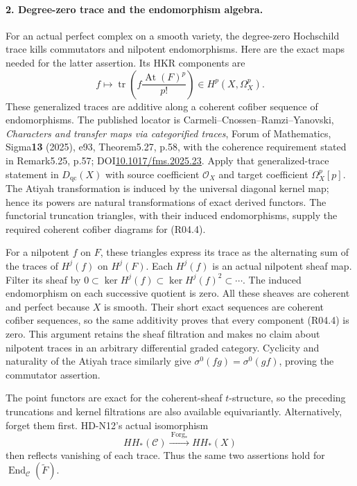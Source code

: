 \paragraph{2. Degree-zero trace and the endomorphism algebra.}
For an actual perfect complex on a smooth variety, the degree-zero
Hochschild trace kills commutators and nilpotent endomorphisms.
Here are the exact maps needed for the latter assertion. Its HKR
components are
\[
 f\longmapsto\operatorname{tr}\!\left(
                         f\frac{\operatorname{At}(F)^p}{p!}\right)
                 \in H^p(X,\Omega_X^p).                         \tag{R04.4}
\]
These generalized traces are additive along a coherent cofiber
sequence of endomorphisms. The published locator is
Carmeli--Cnossen--Ramzi--Yanovski, \emph{Characters and transfer maps
via categorified traces}, Forum of Mathematics, Sigma\textbf{13}
(2025), e93, Theorem5.27, p.58, with the coherence requirement stated
in Remark5.25, p.57; DOI\href{https://doi.org/10.1017/fms.2025.23}
{10.1017/fms.2025.23}. Apply that generalized-trace statement in
$D_{\mathrm{qc}}(X)$ with source coefficient $\mathcal O_X$ and target
coefficient $\Omega_X^p[p]$. The Atiyah transformation is induced by
the universal diagonal kernel map; hence its powers are natural
transformations of exact derived functors. The functorial truncation
triangles, with their induced endomorphisms, supply the required
coherent cofiber diagrams for (R04.4).

For a nilpotent $f$ on $F$, these triangles express its trace as the
alternating sum of the traces of $H^j(f)$ on $H^j(F)$. Each $H^j(f)$
is an actual nilpotent sheaf map. Filter its sheaf by
$0\subset\ker H^j(f)\subset\ker H^j(f)^2\subset\cdots$.
The induced endomorphism on each successive quotient is zero.
All these sheaves are coherent and perfect because $X$ is smooth.
Their short exact sequences are coherent cofiber sequences, so the
same additivity proves that every component (R04.4) is zero.
This argument retains the sheaf filtration and makes no claim about
nilpotent traces in an arbitrary differential graded category.
Cyclicity and naturality of the Atiyah trace similarly give
$\sigma^0(fg)=\sigma^0(gf)$, proving the commutator assertion.

The point functors are exact for the coherent-sheaf $t$-structure,
so the preceding truncations and kernel filtrations are also
available equivariantly. Alternatively, forget them first. HD-N12's
actual isomorphism
\[
              HH_*(\mathcal C)\xrightarrow{\ \mathrm{Forg}_*\ }
                                      HH_*(X)                    \tag{R04.5}
\]
then reflects vanishing of each trace. Thus the same two assertions
hold for $\operatorname{End}_{\mathcal C}(\widetilde F)$.

